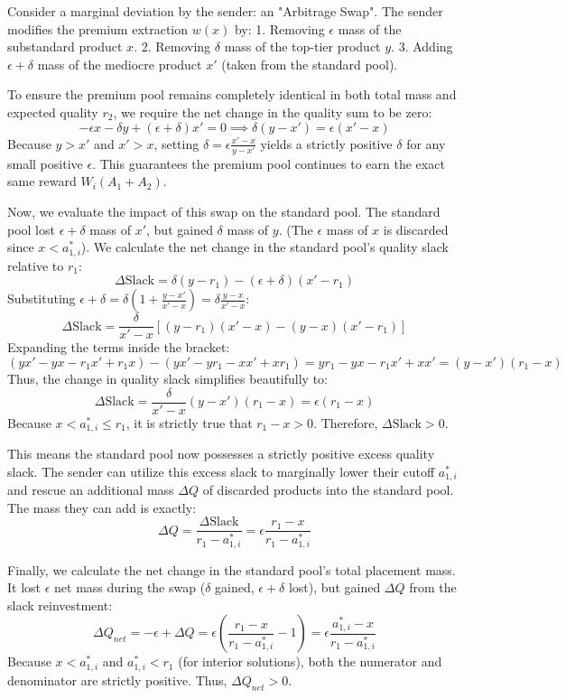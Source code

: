 \documentclass[12pt, a4paper]{article}
\begin{document}
    Consider a marginal deviation by the sender: an "Arbitrage Swap". The sender modifies the premium extraction $w(x)$ by:
    1. Removing $\epsilon$ mass of the substandard product $x$.
    2. Removing $\delta$ mass of the top-tier product $y$.
    3. Adding $\epsilon + \delta$ mass of the mediocre product $x'$ (taken from the standard pool).
    
    To ensure the premium pool remains completely identical in both total mass and expected quality $r_2$, we require the net change in the quality sum to be zero:
    $$ -\epsilon x - \delta y + (\epsilon + \delta)x' = 0 \implies \delta(y - x') = \epsilon(x' - x) $$
    Because $y > x'$ and $x' > x$, setting $\delta = \epsilon \frac{x' - x}{y - x'}$ yields a strictly positive $\delta$ for any small positive $\epsilon$. This guarantees the premium pool continues to earn the exact same reward $W_i(A_1 + A_2)$.

    Now, we evaluate the impact of this swap on the standard pool. The standard pool lost $\epsilon + \delta$ mass of $x'$, but gained $\delta$ mass of $y$. (The $\epsilon$ mass of $x$ is discarded since $x < a_{1,i}^*$). 
    We calculate the net change in the standard pool's quality slack relative to $r_1$:
    $$ \Delta \text{Slack} = \delta(y - r_1) - (\epsilon + \delta)(x' - r_1) $$
    Substituting $\epsilon + \delta = \delta \left(1 + \frac{y - x'}{x' - x}\right) = \delta \frac{y - x}{x' - x}$:
    $$ \Delta \text{Slack} = \frac{\delta}{x' - x} \left[ (y - r_1)(x' - x) - (y - x)(x' - r_1) \right] $$
    Expanding the terms inside the bracket:
    $$ (y x' - y x - r_1 x' + r_1 x) - (y x' - y r_1 - x x' + x r_1) = y r_1 - y x - r_1 x' + x x' = (y - x')(r_1 - x) $$
    Thus, the change in quality slack simplifies beautifully to:
    $$ \Delta \text{Slack} = \frac{\delta}{x' - x} (y - x')(r_1 - x) = \epsilon(r_1 - x) $$
    Because $x < a_{1,i}^* \le r_1$, it is strictly true that $r_1 - x > 0$. Therefore, $\Delta \text{Slack} > 0$. 

    This means the standard pool now possesses a strictly positive excess quality slack. The sender can utilize this excess slack to marginally lower their cutoff $a_{1,i}^*$ and rescue an additional mass $\Delta Q$ of discarded products into the standard pool. The mass they can add is exactly:
    $$ \Delta Q = \frac{\Delta \text{Slack}}{r_1 - a_{1,i}^*} = \epsilon \frac{r_1 - x}{r_1 - a_{1,i}^*} $$
    
    Finally, we calculate the net change in the standard pool's total placement mass. It lost $\epsilon$ net mass during the swap ($\delta$ gained, $\epsilon+\delta$ lost), but gained $\Delta Q$ from the slack reinvestment:
    $$ \Delta Q_{net} = -\epsilon + \Delta Q = \epsilon \left( \frac{r_1 - x}{r_1 - a_{1,i}^*} - 1 \right) = \epsilon \frac{a_{1,i}^* - x}{r_1 - a_{1,i}^*} $$
    Because $x < a_{1,i}^*$ and $a_{1,i}^* < r_1$ (for interior solutions), both the numerator and denominator are strictly positive. Thus, $\Delta Q_{net} > 0$.
\end{document}
